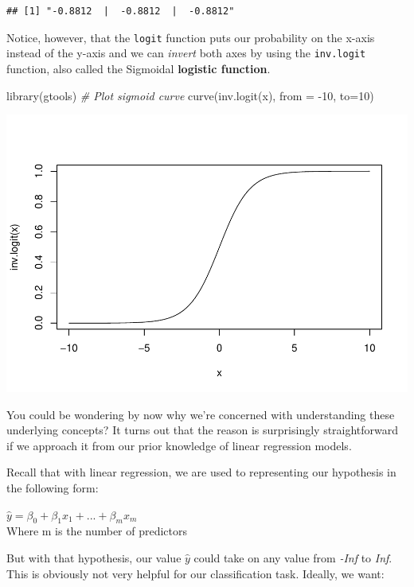 \documentclass[
]{article}
\newenvironment{Shaded}{\begin{snugshade}}{\end{snugshade}}
\newcommand{\AttributeTok}[1]{\textcolor[rgb]{0.77,0.63,0.00}{#1}}
\newcommand{\CommentTok}[1]{\textcolor[rgb]{0.56,0.35,0.01}{\textit{#1}}}
\newcommand{\DecValTok}[1]{\textcolor[rgb]{0.00,0.00,0.81}{#1}}
\newcommand{\FunctionTok}[1]{\textcolor[rgb]{0.00,0.00,0.00}{#1}}
\newcommand{\NormalTok}[1]{#1}
\newcommand{\SpecialCharTok}[1]{\textcolor[rgb]{0.00,0.00,0.00}{#1}}
\begin{document}
\begin{verbatim}
## [1] "-0.8812  |  -0.8812  |  -0.8812"
\end{verbatim}

Notice, however, that the \texttt{logit} function puts our probability
on the x-axis instead of the y-axis and we can \emph{invert} both axes
by using the \texttt{inv.logit} function, also called the Sigmoidal
\textbf{logistic function}.

\begin{Shaded}
\begin{Highlighting}[]
\FunctionTok{library}\NormalTok{(gtools)}
\CommentTok{\# Plot sigmoid curve}
\FunctionTok{curve}\NormalTok{(}\FunctionTok{inv.logit}\NormalTok{(x), }\AttributeTok{from =} \SpecialCharTok{{-}}\DecValTok{10}\NormalTok{, }\AttributeTok{to=}\DecValTok{10}\NormalTok{)}
\end{Highlighting}
\end{Shaded}

\includegraphics{classification1_files/figure-latex/unnamed-chunk-7-1.pdf}

You could be wondering by now why we're concerned with understanding
these underlying concepts? It turns out that the reason is surprisingly
straightforward if we approach it from our prior knowledge of linear
regression models.

Recall that with linear regression, we are used to representing our
hypothesis in the following form:

\(\hat{y} = \beta_0 + \beta_1x_1 + ... + \beta_mx_m\)\\
Where m is the number of predictors

But with that hypothesis, our value \(\hat{y}\) could take on any value
from \emph{-Inf} to \emph{Inf}. This is obviously not very helpful for
our classification task. Ideally, we want:
\end{document}
